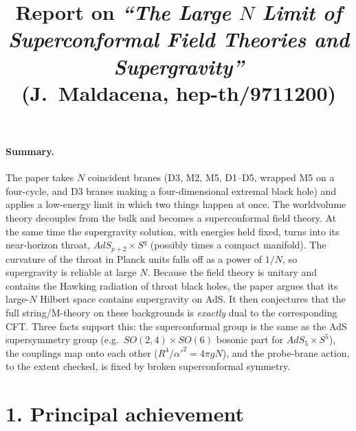 \documentclass[11pt,a4paper]{article}
\title{Report on \emph{``The Large $N$ Limit of Superconformal Field Theories and Supergravity''}\\[2pt]
\large (J.~Maldacena, hep-th/9711200)}
\date{}
\begin{document}
\maketitle
\vspace{-2em}

\paragraph{Summary.}
The paper takes $N$ coincident branes (D3, M2, M5, D1--D5, wrapped M5 on a four-cycle, and D3 branes making a four-dimensional extremal black hole) and applies a low-energy limit in which two things happen at once. The worldvolume theory decouples from the bulk and becomes a superconformal field theory. At the same time the supergravity solution, with energies held fixed, turns into its near-horizon throat, $AdS_{p+2}\times S^q$ (possibly times a compact manifold). The curvature of the throat in Planck units falls off as a power of $1/N$, so supergravity is reliable at large $N$. Because the field theory is unitary and contains the Hawking radiation of throat black holes, the paper argues that its large-$N$ Hilbert space contains supergravity on AdS. It then conjectures that the full string/M-theory on these backgrounds is \emph{exactly} dual to the corresponding CFT. Three facts support this: the superconformal group is the same as the AdS supersymmetry group (e.g.\ $SO(2,4)\times SO(6)$ bosonic part for $AdS_5\times S^5$), the couplings map onto each other ($R^4/\alpha'^2 = 4\pi g N$), and the probe-brane action, to the extent checked, is fixed by broken superconformal symmetry.

\section*{1. Principal achievement}
\end{document}
